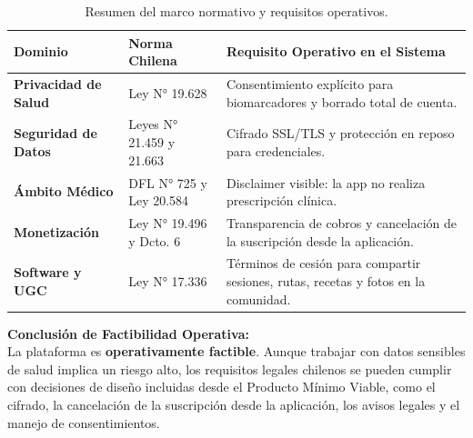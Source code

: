 \begin{table}[h!]
    \centering
    \renewcommand{\arraystretch}{1.5}
    \begin{tabular}{|m{3.5cm}|m{4cm}|m{7cm}|}
        \hline
        \rowcolor[HTML]{EFEFEF}
        \textbf{Dominio} & \textbf{Norma Chilena} & \textbf{Requisito Operativo en el Sistema} \\ \hline
        \textbf{Privacidad de Salud} & Ley N° 19.628 & Consentimiento explícito para biomarcadores y borrado total de cuenta. \\ \hline
        \textbf{Seguridad de Datos} & Leyes N° 21.459 y 21.663 & Cifrado SSL/TLS y protección en reposo para credenciales. \\ \hline
        \textbf{Ámbito Médico} & DFL N° 725 y Ley 20.584 & Disclaimer visible: la app no realiza prescripción clínica. \\ \hline
        \textbf{Monetización} & Ley N° 19.496 y Dcto. 6 & Transparencia de cobros y cancelación de la suscripción desde la aplicación. \\ \hline
        \textbf{Software y UGC} & Ley N° 17.336 & Términos de cesión para compartir sesiones, rutas, recetas y fotos en la comunidad. \\ \hline
    \end{tabular}
    \caption{Resumen del marco normativo y requisitos operativos.}
    \label{tab:resumen_normativo}
\end{table}
\newpage
\textbf{Conclusión de Factibilidad Operativa:}\\
La plataforma es \textbf{operativamente factible}. Aunque trabajar con datos sensibles de salud implica un riesgo alto, los requisitos legales chilenos se pueden cumplir con decisiones de diseño incluidas desde el Producto Mínimo Viable, como el cifrado, la cancelación de la suscripción desde la aplicación, los avisos legales y el manejo de consentimientos.
